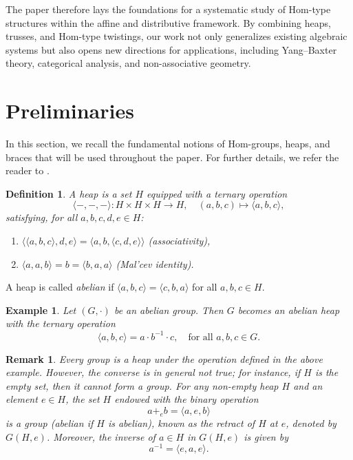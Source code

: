 \documentclass[14pt]{article}
\theoremstyle{Definition}
\newtheorem{Def}[thm]{Definition}
\newtheorem{Rem}[thm]{Remark}
\newtheorem{Exam}[thm]{Example}
\theoremstyle{remark}
\begin{document}
The paper therefore lays the foundations for a systematic study of Hom-type structures 
within the affine and distributive framework. By combining heaps, trusses, and Hom-type 
twistings, our work not only generalizes existing algebraic systems but also opens new 
directions for applications, including Yang--Baxter theory, categorical analysis, and 
non-associative geometry.




\section{Preliminaries}

In this section, we recall the fundamental notions of Hom-groups, heaps, and braces that will be used throughout the paper. For further details, we refer the reader to \cite{Bae, Cer, Rum, Rump, BBRS, Che}.

\begin{Def}\cite{Pru,Brz}
A \emph{heap} is a set $H$ equipped with a ternary operation 
\[
\langle -,-,- \rangle : H \times H \times H \longrightarrow H, \quad (a,b,c) \mapsto \langle a,b,c \rangle,
\]
satisfying, for all $a,b,c,d,e \in H$:
\begin{enumerate}
\item $\langle \langle a,b,c \rangle, d, e \rangle = \langle a,b, \langle c,d,e \rangle \rangle$ \quad (associativity),
\item $\langle a,a,b \rangle = b = \langle b,a,a \rangle$ \quad (Mal'cev identity).
\end{enumerate}
\end{Def}

A heap is called \emph{abelian} if $\langle a,b,c\rangle = \langle c,b,a\rangle$ for all $a,b,c \in H$.

\begin{Exam}
Let $(G,\cdot)$ be an abelian group. Then $G$ becomes an abelian heap with the ternary operation 
\[
\langle a,b,c\rangle = a\cdot b^{-1}\cdot c, \quad \text{for all } a,b,c \in G.
\]
\end{Exam}

\begin{Rem}\label{re1}
Every group is a heap under the operation defined in the above example.  
However, the converse is in general not true; for instance, if $H$ is the empty set, then it cannot form a group.  
For any non-empty heap $H$ and an element $e \in H$, the set $H$ endowed with the binary operation  
\[
a +_{e} b = \langle a, e, b \rangle
\]  
is a group (abelian if $H$ is abelian), known as the \emph{retract} of $H$ at $e$, denoted by $G(H,e)$.  
Moreover, the inverse of $a \in H$ in $G(H,e)$ is given by  
\[
a^{-1} = \langle e, a, e \rangle.
\]
\end{Rem}
\end{document}

